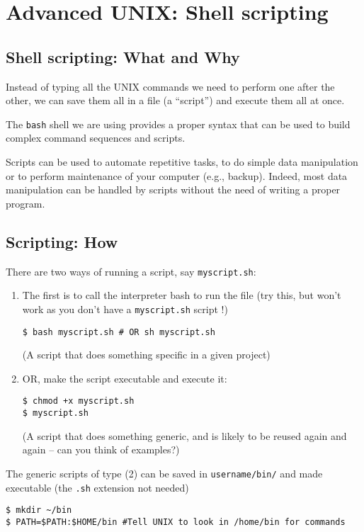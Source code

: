 \chapter{Advanced UNIX: Shell scripting}
\label{chap:sscripting}
 
\section{Shell scripting: What and Why}
 
Instead of typing all the UNIX commands we need to perform one after 
the other, we can save them all in a file (a ``script'') and execute 
them all at once.

The {\tt bash} shell we are using provides a proper syntax that can be 
used to build complex command sequences and scripts. 

Scripts can be used to automate repetitive tasks, to do simple data 
manipulation or to perform maintenance of your computer (e.g., backup). 
Indeed, most data manipulation can be handled by scripts without the 
need of writing a proper program. 

\section{Scripting: How}

There are two ways of running a script, say {\tt myscript.sh}:
 
\begin{enumerate}\itemsep6pt
	\item The first is to call the interpreter bash to run the file (try 
	this, but won't work as you don't have a {\tt myscript.sh} script !)
\begin{lstlisting}
$ bash myscript.sh # OR sh myscript.sh
\end{lstlisting}
(A script that does something specific in a given project)

\item OR, make the script executable and execute it:
\begin{lstlisting}
$ chmod +x myscript.sh
$ myscript.sh
\end{lstlisting}
(A script that does something generic, and is likely to be reused again 
and again -- can you think of examples?)

\end{enumerate}
The generic scripts of type (2) can be saved in {\tt username/bin/}
and made executable (the {\tt .sh} extension not needed)
\begin{lstlisting}
$ mkdir ~/bin
$ PATH=$PATH:$HOME/bin #Tell UNIX to look in /home/bin for commands
\end{lstlisting}



